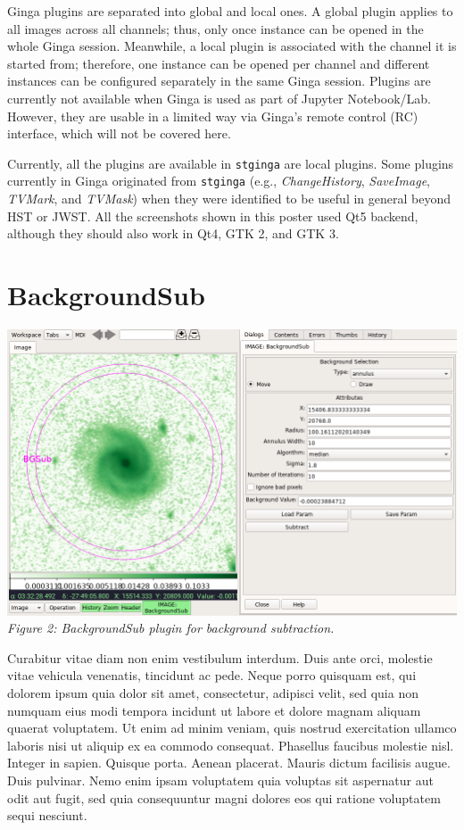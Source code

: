 \documentclass[]{article}
\begin{document}
\begin{multicols}{3}
\para
Ginga plugins are separated into global and local ones. A global plugin applies
to all images across all channels; thus, only once instance can be opened
in the whole Ginga session.
Meanwhile, a local plugin is associated with the channel it is started from;
therefore, one instance can be opened per channel and different instances
can be configured separately in the same Ginga session.
Plugins are currently not available when Ginga is used as part of Jupyter
Notebook/Lab. However, they are usable in a limited way via Ginga's remote
control (RC) interface, which will not be covered here.

\para
Currently, all the plugins are available in {\tt stginga} are local plugins.
Some plugins currently in Ginga originated from {\tt stginga}
(e.g., {\em ChangeHistory}, {\em SaveImage}, {\em TVMark}, and {\em TVMask})
when they were identified to be useful in general beyond HST or JWST.
All the screenshots shown in this poster used Qt5 backend, although they should
also work in Qt4, GTK 2, and GTK 3.

\section*{BackgroundSub}

\para
\begin{center}
\includegraphics[width=8in]{plugin_backgroundsub} \\
\vspace*{0.4em}
\label{fig:plugin_backgroundsub}
{\small\em Figure 2: BackgroundSub plugin for background subtraction.}
\end{center}

\para
Curabitur vitae diam non enim vestibulum interdum. Duis ante orci,
molestie vitae vehicula venenatis, tincidunt ac pede. Neque porro
quisquam est, qui dolorem ipsum quia dolor sit amet, consectetur,
adipisci velit, sed quia non numquam eius modi tempora incidunt ut
labore et dolore magnam aliquam quaerat voluptatem. Ut enim ad minim
veniam, quis nostrud exercitation ullamco laboris nisi ut aliquip ex ea
commodo consequat. Phasellus faucibus molestie nisl. Integer in
sapien. Quisque porta. Aenean placerat. Mauris dictum facilisis
augue. Duis pulvinar. Nemo enim ipsam voluptatem quia voluptas sit
aspernatur aut odit aut fugit, sed quia consequuntur magni dolores eos
qui ratione voluptatem sequi nesciunt.


\end{multicols}
\end{document}
